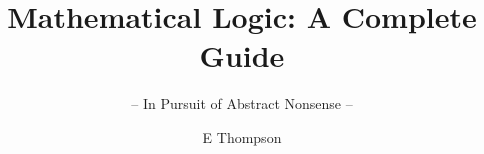 \documentclass[graybox,envcountchap,sectrefs]{style/svmono}
\begin{document}
\author{E Thompson}
\title{Mathematical Logic: A Complete Guide}
\subtitle{-- In Pursuit of Abstract Nonsense --}
\maketitle

\frontmatter%

%
%

%

\tableofcontents

%


\mainmatter%























































\backmatter%
%
%
%
\printindex

\end{document}
